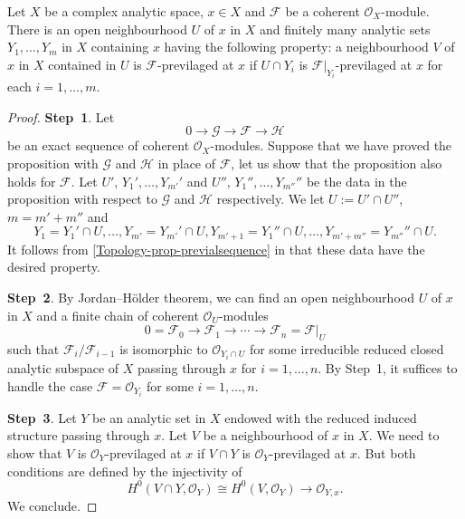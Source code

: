 \begin{proposition}\label{prop-previasmallnei}
    Let $X$ be a complex analytic space, $x\in X$ and $\mathcal{F}$ be a coherent $\mathcal{O}_X$-module. There is an open neighbourhood $U$ of $x$ in $X$ and finitely many analytic sets $Y_1,\ldots,Y_m$ in $X$ containing $x$ having the following property: a neighbourhood $V$ of $x$ in $X$ contained in $U$ is $\mathcal{F}$-previlaged at $x$ if $U\cap Y_i$ is $\mathcal{F}|_{Y_i}$-previlaged at $x$ for each $i=1,\ldots,m$. 
\end{proposition}
\begin{proof}
    \textbf{Step~1}. Let 
    \[
        0\rightarrow \mathcal{G}\rightarrow \mathcal{F}\rightarrow \mathcal{H}
    \]
    be an exact sequence of coherent $\mathcal{O}_X$-modules. Suppose that we have proved the proposition with $\mathcal{G}$ and $\mathcal{H}$ in place of $\mathcal{F}$, let us show that the proposition also holds for $\mathcal{F}$. Let $U'$, $Y_1',\ldots,Y_{m'}'$ and $U''$, $Y_1'',\ldots,Y_{m''}''$ be the data in the proposition with respect to $\mathcal{G}$ and $\mathcal{H}$ respectively. We let $U:=U'\cap U''$, $m=m'+m''$ and
    \[
        Y_1=Y_1'\cap U,\ldots,Y_{m'}=Y_{m'}'\cap U, Y_{m'+1}=Y_{1}''\cap U,\ldots,Y_{m'+m''}=Y_{m''}''\cap U.  
    \]
    It follows from \cref{Topology-prop-previalsequence} in  that these data have the desired property.

    \textbf{Step~2}. By Jordan--Hölder theorem, we can find an open neighbourhood $U$ of $x$ in $X$ and a finite chain of coherent $\mathcal{O}_U$-modules 
    \[
        0=\mathcal{F}_0\rightarrow \mathcal{F}_1\rightarrow \cdots \rightarrow \mathcal{F}_n=\mathcal{F}|_U  
    \]
    such that $\mathcal{F}_{i}/\mathcal{F}_{i-1}$ is isomorphic to $\mathcal{O}_{Y_i\cap U}$ for some irreducible reduced closed analytic subspace of $X$ passing through $x$ for $i=1,\ldots,n$. By Step~1, it suffices to handle the case $\mathcal{F}=\mathcal{O}_{Y_i}$ for some $i=1,\ldots,n$. 
    
    \textbf{Step~3}. Let $Y$ be an analytic set in $X$ endowed with the reduced induced structure passing through $x$. Let $V$ be a neighbourhood of $x$ in $X$. We need to show that $V$ is $\mathcal{O}_Y$-previlaged at $x$ if $V\cap Y$ is $\mathcal{O}_{Y}$-previlaged at $x$.
    But both conditions are defined by the injectivity of
    \[
        H^0(V\cap Y,\mathcal{O}_{Y})\cong H^0(V,\mathcal{O}_Y)\rightarrow \mathcal{O}_{Y,x}.     
    \]
    We conclude.
\end{proof}

